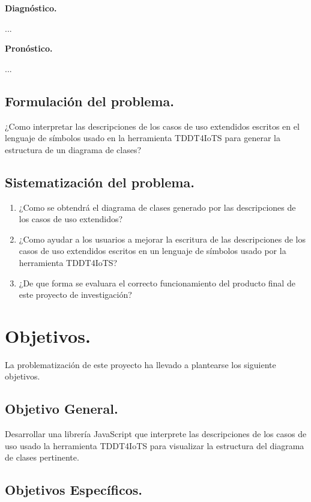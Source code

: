 \textbf{Diagnóstico.}

...

\textbf{Pronóstico.}

...

\subsection{Formulación del problema.}

¿Como interpretar las descripciones de los casos de uso extendidos escritos en el lenguaje de símbolos usado en la herramienta TDDT4IoTS para generar la estructura de un diagrama de clases?

\subsection{Sistematización del problema.}

\begin{enumerate}
	\item ¿Como se obtendrá el diagrama de clases generado por las descripciones de los casos de uso extendidos?
	
	\item ¿Como ayudar a los usuarios a mejorar la escritura de las descripciones de los casos de uso extendidos escritos en un lenguaje de símbolos usado por la herramienta TDDT4IoTS?
	
	\item ¿De que forma se evaluara el correcto funcionamiento del producto final de este proyecto de investigación?
\end{enumerate}

\section{Objetivos.}

La problematización de este proyecto ha llevado a plantearse los siguiente objetivos.

\subsection{Objetivo General.}

Desarrollar una librería JavaScript que interprete las descripciones de los casos de uso usado la herramienta TDDT4IoTS para visualizar la estructura del diagrama de clases pertinente. 

\subsection{Objetivos Específicos.}

